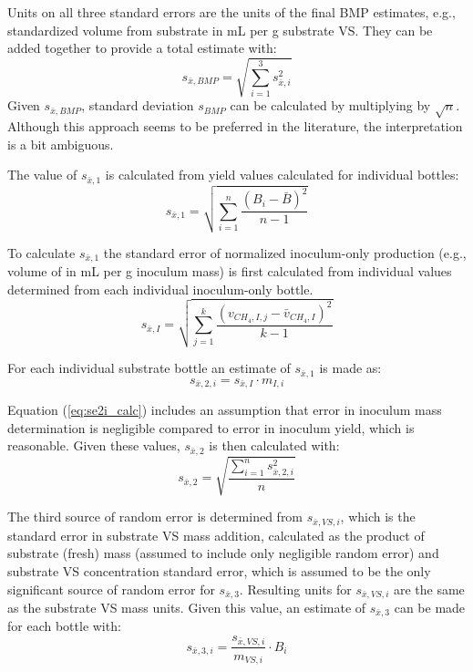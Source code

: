 \documentclass[]{article}
\begin{document}
Units on all three standard errors are the units of the final BMP estimates, e.g., standardized  volume from substrate in mL per g substrate VS. 
They can be added together to provide a total estimate with:
\begin{equation}
  \label{eq:se_sum}
  s_{\bar{x},BMP} = \sqrt{\sum_{i=1} ^3 s_{\bar{x},i}^2}
\end{equation}
Given $s_{\bar{x},BMP}$, standard deviation $s_{BMP}$ can be calculated by multiplying by $\sqrt{n}$.
Although this approach seems to be preferred in the literature, the interpretation is a bit ambiguous. 

The value of $s_{\bar{x},1}$ is calculated from yield values calculated for individual bottles: 
\begin{equation}
  \label{eq:se1_calc}
  s_{\bar{x},1} = \sqrt{\sum_{i=1} ^n \frac{(B_i - \bar{B})^2} {n -1} }
\end{equation}

To calculate $s_{\bar{x},1}$ the standard error of normalized inoculum-only  production (e.g., volume of  in mL per g inoculum mass) is first calculated from individual values determined from each individual inoculum-only bottle. 
\begin{equation}
  \label{eq:seI_calc}
  s_{\bar{x},I} = \sqrt{\sum_{j=1} ^k \frac{(v_{CH_4, I, j} - \bar{v}_{CH_4, I})^2} {k -1} }
\end{equation}

For each individual substrate bottle an estimate of $s_{\bar{x},1}$ is made as:
\begin{equation}
  \label{eq:se2i_calc}
  s_{\bar{x},2,i} = s_{\bar{x},I} \cdot m_{I, i} 
\end{equation}

Equation (\ref{eq:se2i_calc}) includes an assumption that error in inoculum mass determination is negligible compared to error in inoculum  yield, which is reasonable. 
Given these values, $s_{\bar{x},2}$ is then calculated with:
\begin{equation}
  \label{eq:se2_calc}
  s_{\bar{x},2} = \sqrt{\frac{\sum_{i=1} ^n s_{\bar{x},2,i}^2} {n}}
\end{equation}

The third source of random error is determined from $s_{\bar{x},VS,i}$, which is the standard error in substrate VS mass addition, calculated as the product of substrate (fresh) mass (assumed to include only negligible random error) and substrate VS concentration standard error, which is assumed to be the only significant source of random error for $s_{\bar{x},3}$. 
Resulting units for $s_{\bar{x},VS,i}$ are the same as the substrate VS mass units. 
Given this value, an estimate of $s_{\bar{x},3}$ can be made for each bottle with:
\begin{equation}
  \label{eq:se3i_calc}
  s_{\bar{x},3,i} = \frac{s_{\bar{x},VS,i}} {m_{VS,i}} \cdot B_{i}
\end{equation}
\end{document}
